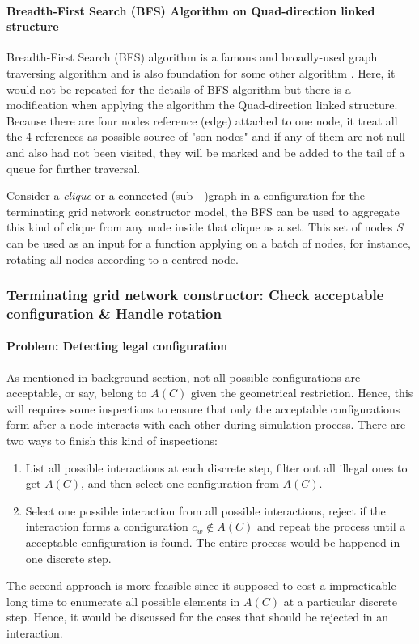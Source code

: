 \paragraph{Breadth-First Search (BFS) Algorithm \cite{Cormen:2009:IAT:1614191} on Quad-direction linked structure}
Breadth-First Search (BFS) algorithm is a famous and broadly-used graph traversing algorithm and is also
foundation for some other algorithm \cite{Cormen:2009:IAT:1614191}. Here, it would not be repeated for the
details of BFS algorithm but there is a modification when applying the algorithm the Quad-direction linked structure.
Because there are four nodes reference (edge) attached to one node, it treat all the 4 references as possible source of "son nodes" and if
any of them are not null and also had not been visited, they will be marked and be added to the tail of a queue for further traversal.

\par\noindent
Consider a \textit{clique} or a connected (sub - )graph in a configuration for the terminating grid network constructor model,
the BFS can be used to aggregate this kind of clique from any node inside that clique as a set. This set of nodes $S$ can be used
as an input for a function applying on a batch of nodes, for instance, rotating all nodes according to a centred node.

\subsubsection{Terminating grid network constructor: Check acceptable configuration \& Handle rotation}
\paragraph{Problem: Detecting legal configuration}
As mentioned in background section, not all possible configurations are acceptable, or say, belong to $A(C)$ given the geometrical restriction\cite{Mi17}.
Hence, this will requires some inspections to ensure that only the acceptable configurations form
after a node interacts with each other during simulation process. There are two ways to finish this kind of inspections:
\begin{enumerate}
  \item List all possible interactions at each discrete step, filter out
  all illegal ones to get $A(C)$, and then select one configuration from $A(C)$.
  \item Select one possible interaction from all possible interactions, reject if the interaction forms a configuration $c_{w} \not\in A(C)$
  and repeat the process until a acceptable configuration is found. The entire process would be happened in one discrete step.
\end{enumerate}
The second approach is more feasible since it supposed to cost a impracticable long time to enumerate all possible elements in $A(C)$ at a particular discrete step.
Hence, it would be discussed for the cases that should be rejected in an interaction.

